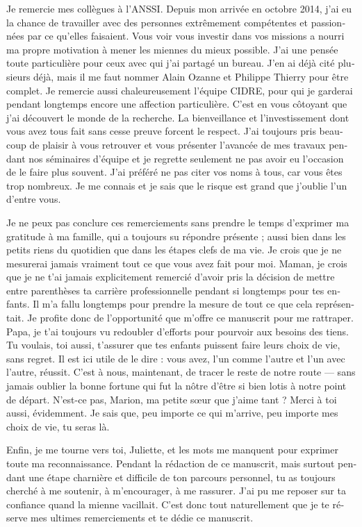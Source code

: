\begin{otherlanguage}{french}
  Je remercie mes collègues à l’ANSSI. Depuis mon arrivée en octobre 2014, j’ai
  eu la chance de travailler avec des personnes extrêmement compétentes et
  passionnées par ce qu’elles faisaient. Vous voir vous investir dans vos
  missions a nourri ma propre motivation à mener les miennes du mieux
  possible. J’ai une pensée toute particulière pour ceux avec qui j’ai partagé
  un bureau. J’en ai déjà cité plusieurs déjà, mais il me faut nommer Alain
  Ozanne et Philippe Thierry pour être complet.
  Je remercie aussi chaleureusement l’équipe CIDRE, pour qui je garderai pendant
  longtemps encore une affection particulière. C’est en vous côtoyant que j’ai
  découvert le monde de la recherche. La bienveillance et l’investissement dont
  vous avez tous fait sans cesse preuve forcent le respect. J’ai toujours pris
  beaucoup de plaisir à vous retrouver et vous présenter l’avancée de mes
  travaux pendant nos séminaires d’équipe et je regrette seulement ne pas avoir
  eu l’occasion de le faire plus souvent.
  J’ai préféré ne pas citer vos noms à tous, car vous êtes trop nombreux. Je me
  connais et je sais que le risque est grand que j’oublie l’un d’entre vous.

  Je ne peux pas conclure ces remerciements sans prendre le temps d’exprimer ma
  gratitude à ma famille, qui a toujours su répondre présente ; aussi bien dans
  les petits riens du quotidien que dans les étapes clefs de ma vie. Je crois
  que je ne mesurerai jamais vraiment tout ce que vous avez fait pour
  moi. Maman, je crois que je ne t’ai jamais explicitement remercié d’avoir pris
  la décision de mettre entre parenthèses ta carrière professionnelle pendant si
  longtemps pour tes enfants. Il m’a fallu longtemps pour prendre la mesure de
  tout ce que cela représentait. Je profite donc de l’opportunité que m’offre ce
  manuscrit pour me rattraper. Papa, je t’ai toujours vu redoubler d’efforts
  pour pourvoir aux besoins des tiens. Tu voulais, toi aussi, t’assurer que tes
  enfants puissent faire leurs choix de vie, sans regret. Il est ici utile de le
  dire : vous avez, l’un comme l’autre et l’un avec l’autre, réussit. C’est à
  nous, maintenant, de tracer le reste de notre route --- sans jamais oublier la
  bonne fortune qui fut la nôtre d’être si bien lotis à notre point de départ.
  N’est-ce pas, Marion, ma petite sœur que j’aime tant ? Merci à toi aussi,
  évidemment. Je sais que, peu importe ce qui m’arrive, peu importe mes choix de
  vie, tu seras là.

  Enfin, je me tourne vers toi, Juliette, et les mots me manquent pour exprimer
  toute ma reconnaissance. Pendant la rédaction de ce manuscrit, mais surtout
  pendant une étape charnière et difficile de ton parcours personnel, tu as
  toujours cherché à me soutenir, à m’encourager, à me rassurer. J’ai pu me
  reposer sur ta confiance quand la mienne vacillait. C’est donc tout
  naturellement que je te réserve mes ultimes remerciements et te dédie ce
  manuscrit.
\end{otherlanguage}
